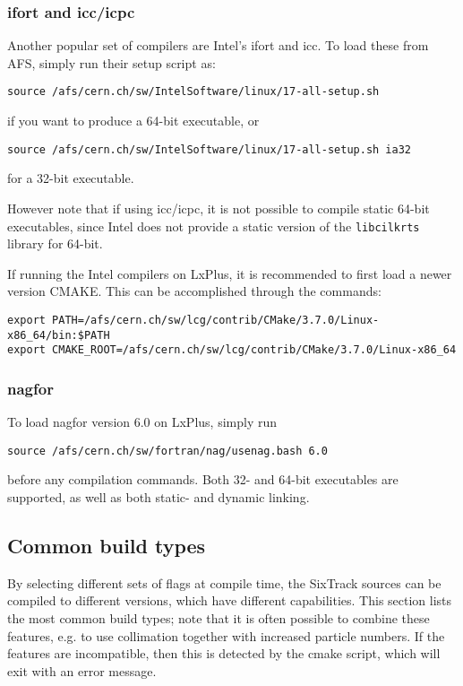 \documentclass[english,BCOR=0mm,DIV=18]{scrartcl}
\begin{document}

\subsubsection{ifort and icc/icpc}
\label{sec:building:compilers:intel}
Another popular set of compilers are Intel's ifort and icc.
To load these from AFS, simply run their setup script as:
\begin{lstlisting}
source /afs/cern.ch/sw/IntelSoftware/linux/17-all-setup.sh
\end{lstlisting}
if you want to produce a 64-bit executable, or
\begin{lstlisting}
source /afs/cern.ch/sw/IntelSoftware/linux/17-all-setup.sh ia32
\end{lstlisting}
for a 32-bit executable.

However note that if using icc/icpc, it is not possible to compile static 64-bit executables, since Intel does not provide a static version of the \texttt{libcilkrts} library for 64-bit.

If running the Intel compilers on LxPlus, it is recommended to first load a newer version CMAKE.
This can be accomplished through the commands:
\begin{lstlisting}
export PATH=/afs/cern.ch/sw/lcg/contrib/CMake/3.7.0/Linux-x86_64/bin:$PATH
export CMAKE_ROOT=/afs/cern.ch/sw/lcg/contrib/CMake/3.7.0/Linux-x86_64
\end{lstlisting} %

\subsubsection{nagfor}

To load nagfor version 6.0 on LxPlus, simply run
\begin{lstlisting}
source /afs/cern.ch/sw/fortran/nag/usenag.bash 6.0
\end{lstlisting}
before any compilation commands.
Both 32- and 64-bit executables are supported, as well as both static- and dynamic linking.


\subsection{Common build types}
\label{sec:building:options}
By selecting different sets of flags at compile time, the SixTrack sources can be compiled to different versions, which have different capabilities.
This section lists the most common build types; note that it is often possible to combine these features, e.g. to use collimation together with increased particle numbers.
If the features are incompatible, then this is detected by the cmake script, which will exit with an error message.
\end{document}
